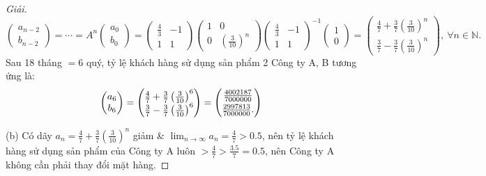 \documentclass{article}
\begin{document}
\begin{proof}[Giải]
\begin{equation*}
\begin{pmatrix}
			a_{n-2}\\b_{n-2}
		\end{pmatrix} = \cdots = A^n\begin{pmatrix}
			a_0\\b_0
		\end{pmatrix} = \begin{pmatrix}
			\frac{4}{3} & -1\\1 & 1
		\end{pmatrix}\begin{pmatrix}
			1 & 0\\0 & \left(\frac{3}{10}\right)^n
		\end{pmatrix}\begin{pmatrix}
			\frac{4}{3} & -1\\1 & 1
		\end{pmatrix}^{-1}\begin{pmatrix}
			1\\0
		\end{pmatrix} = \begin{pmatrix}
			\frac{4}{7} + \frac{3}{7}\left(\frac{3}{10}\right)^n\\\frac{3}{7} - \frac{3}{7}\left(\frac{3}{10}\right)^n
		\end{pmatrix},\ \forall n\in\mathbb{N}.
	\end{equation*}
	Sau 18 tháng $= 6$ quý, tỷ lệ khách hàng sử dụng sản phẩm 2 Công ty A, B tương ứng là:
	\begin{equation*}
		\begin{pmatrix}
			a_6\\b_6
		\end{pmatrix} = \begin{pmatrix}
			\frac{4}{7} + \frac{3}{7}\left(\frac{3}{10}\right)^6\\\frac{3}{7} - \frac{3}{7}\left(\frac{3}{10}\right)^6
		\end{pmatrix} = \begin{pmatrix}
			\frac{4002187}{7000000}\vspace{1mm}\\\frac{2997813}{7000000}.
		\end{pmatrix}
	\end{equation*}
	\item(b) Có dãy $a_n = \frac{4}{7} + \frac{3}{7}\left(\frac{3}{10}\right)^n$ giảm \& $\lim_{n\to\infty} a_n = \frac{4}{7} > 0.5$, nên tỷ lệ khách hàng sử dụng sản phẩm của Công ty A luôn $> \frac{4}{7} > \frac{3.5}{7} = 0.5$, nên Công ty A không cần phải thay đổi mặt hàng.
\end{proof}
\end{document}
